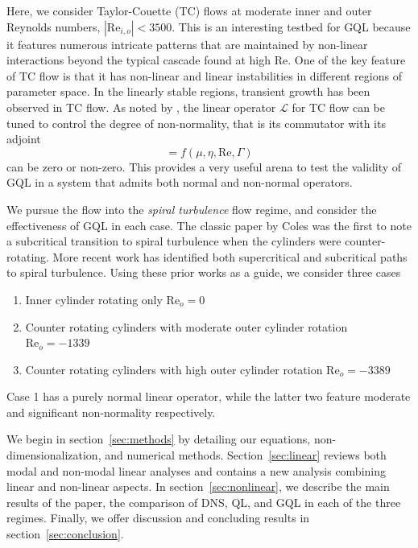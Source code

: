 \documentclass[openacc]{rstransa}%
\newcommand{\Reyn}{\mathrm{Re}}
\newcommand{\Lop}{\mathcal{L}}
\begin{document}
Here, we consider Taylor-Couette (TC) flows at moderate inner and outer Reynolds numbers, $|\Reyn_{i,o}| < 3500$. This is an interesting testbed for GQL because it features numerous intricate patterns that are maintained by non-linear interactions beyond the typical cascade found at high $\Reyn$. 
One of the key feature of TC flow is that it has non-linear and linear instabilities in different regions of parameter space. In the linearly stable regions, transient growth has been observed in TC flow. 
As noted by \cite{2002PhFl...14.3475H}, the linear operator $\Lop$ for TC flow can be tuned to control the degree of non-normality, that is its commutator with its adjoint
\begin{equation}
    [\Lop^\dagger, \Lop] = f(\mu, \eta, \Reyn, \Gamma)
\end{equation}
can be zero or non-zero. 
This provides a very useful arena to test the validity of GQL in a system that admits both normal and non-normal operators. 

We pursue the flow into the \emph{spiral turbulence} flow regime, and consider the effectiveness of GQL in each case. The classic paper by Coles \cite{1965JFM....21..385C} was the first to note a subcritical transition to spiral turbulence when the cylinders were counter-rotating. More recent work has identified both supercritical and subcritical paths to spiral turbulence\cite{2009PhRvE..80d6315M}.
Using these prior works as a guide, we consider three cases
\begin{enumerate}
    \item Inner cylinder rotating only $\Reyn_o = 0$
    \item Counter rotating cylinders with moderate outer cylinder rotation $\Reyn_o = -1339$
    \item Counter rotating cylinders with high outer cylinder rotation $\Reyn_o = -3389$
\end{enumerate}
Case 1 has a purely normal linear operator, while the latter two feature moderate and significant non-normality respectively. 

We begin in section~\ref{sec:methods} by detailing our equations, non-dimensionalization, and numerical methods. Section~\ref{sec:linear} reviews both modal and non-modal linear analyses and contains a new analysis combining linear and non-linear aspects. In section~\ref{sec:nonlinear}, we describe the main results of the paper, the comparison of DNS, QL, and GQL in each of the three regimes. Finally, we offer discussion and concluding results in section~\ref{sec:conclusion}.
\end{document}
